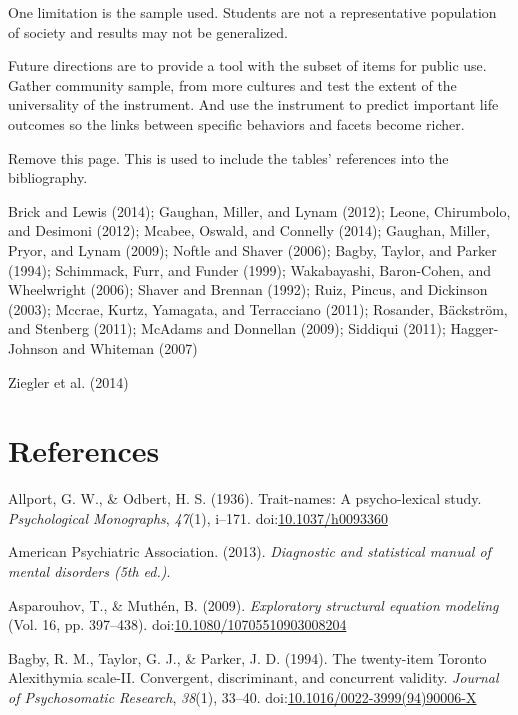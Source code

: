 \documentclass[,man,floatsintext]{apa6}
\theoremstyle{definition}
\theoremstyle{definition}
\theoremstyle{definition}
\theoremstyle{remark}
\begin{document}
One limitation is the sample used. Students are not a representative
population of society and results may not be generalized.

Future directions are to provide a tool with the subset of items for
public use. Gather community sample, from more cultures and test the
extent of the universality of the instrument. And use the instrument to
predict important life outcomes so the links between specific behaviors
and facets become richer.

\newpage

Remove this page. This is used to include the tables' references into
the bibliography.

Brick and Lewis (2014); Gaughan, Miller, and Lynam (2012); Leone,
Chirumbolo, and Desimoni (2012); Mcabee, Oswald, and Connelly (2014);
Gaughan, Miller, Pryor, and Lynam (2009); Noftle and Shaver (2006);
Bagby, Taylor, and Parker (1994); Schimmack, Furr, and Funder (1999);
Wakabayashi, Baron-Cohen, and Wheelwright (2006); Shaver and Brennan
(1992); Ruiz, Pincus, and Dickinson (2003); Mccrae, Kurtz, Yamagata, and
Terracciano (2011); Rosander, Bäckström, and Stenberg (2011); McAdams
and Donnellan (2009); Siddiqui (2011); Hagger-Johnson and Whiteman
(2007)

Ziegler et al. (2014)

\newpage

\hypertarget{references}{%
\section{References}\label{references}}

\begingroup
\setlength{\parindent}{-0.5in}
\setlength{\leftskip}{0.5in}

\hypertarget{refs}{}
\leavevmode\hypertarget{ref-AllportOdbert1936}{}%
Allport, G. W., \& Odbert, H. S. (1936). Trait-names: A psycho-lexical
study. \emph{Psychological Monographs}, \emph{47}(1), i--171.
doi:\href{https://doi.org/10.1037/h0093360}{10.1037/h0093360}

\leavevmode\hypertarget{ref-APA2013}{}%
American Psychiatric Association. (2013). \emph{Diagnostic and
statistical manual of mental disorders (5th ed.)}.

\leavevmode\hypertarget{ref-AsparouhovMuthen2009}{}%
Asparouhov, T., \& Muthén, B. (2009). \emph{Exploratory structural
equation modeling} (Vol. 16, pp. 397--438).
doi:\href{https://doi.org/10.1080/10705510903008204}{10.1080/10705510903008204}

\leavevmode\hypertarget{ref-Bagby1994}{}%
Bagby, R. M., Taylor, G. J., \& Parker, J. D. (1994). The twenty-item
Toronto Alexithymia scale-II. Convergent, discriminant, and concurrent
validity. \emph{Journal of Psychosomatic Research}, \emph{38}(1),
33--40.
doi:\href{https://doi.org/10.1016/0022-3999(94)90006-X}{10.1016/0022-3999(94)90006-X}
\end{document}
